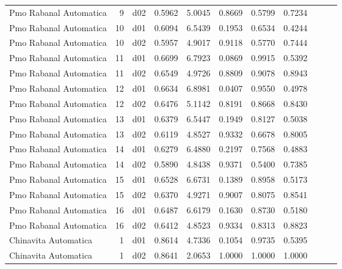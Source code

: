\begin{landscape}
\begin{longtable}{p{2cm}rrrrrrrrrr}
 Pmo Rabanal Automatica   &          9 &     d02 &   0.5962 &  5.0045 &        0.8669 &           0.5799 &  0.7234 \\
 Pmo Rabanal Automatica   &         10 &     d01 &   0.6094 &  6.5439 &        0.1953 &           0.6534 &  0.4244 \\
 Pmo Rabanal Automatica   &         10 &     d02 &   0.5957 &  4.9017 &        0.9118 &           0.5770 &  0.7444 \\
 Pmo Rabanal Automatica   &         11 &     d01 &   0.6699 &  6.7923 &        0.0869 &           0.9915 &  0.5392 \\
 Pmo Rabanal Automatica   &         11 &     d02 &   0.6549 &  4.9726 &        0.8809 &           0.9078 &  0.8943 \\
 Pmo Rabanal Automatica   &         12 &     d01 &   0.6634 &  6.8981 &        0.0407 &           0.9550 &  0.4978 \\
 Pmo Rabanal Automatica   &         12 &     d02 &   0.6476 &  5.1142 &        0.8191 &           0.8668 &  0.8430 \\
 Pmo Rabanal Automatica   &         13 &     d01 &   0.6379 &  6.5447 &        0.1949 &           0.8127 &  0.5038 \\
 Pmo Rabanal Automatica   &         13 &     d02 &   0.6119 &  4.8527 &        0.9332 &           0.6678 &  0.8005 \\
 Pmo Rabanal Automatica   &         14 &     d01 &   0.6279 &  6.4880 &        0.2197 &           0.7568 &  0.4883 \\
 Pmo Rabanal Automatica   &         14 &     d02 &   0.5890 &  4.8438 &        0.9371 &           0.5400 &  0.7385 \\
 Pmo Rabanal Automatica   &         15 &     d01 &   0.6528 &  6.6731 &        0.1389 &           0.8958 &  0.5173 \\
 Pmo Rabanal Automatica   &         15 &     d02 &   0.6370 &  4.9271 &        0.9007 &           0.8075 &  0.8541 \\
 Pmo Rabanal Automatica   &         16 &     d01 &   0.6487 &  6.6179 &        0.1630 &           0.8730 &  0.5180 \\
 Pmo Rabanal Automatica   &         16 &     d02 &   0.6412 &  4.8523 &        0.9334 &           0.8313 &  0.8823 \\
    Chinavita Automatica  &          1 &     d01 &   0.8614 &  4.7336 &        0.1054 &           0.9735 &  0.5395 \\
    Chinavita Automatica  &          1 &     d02 &   0.8641 &  2.0653 &        1.0000 &           1.0000 &  1.0000 \\

\end{longtable}
\end{landscape}

